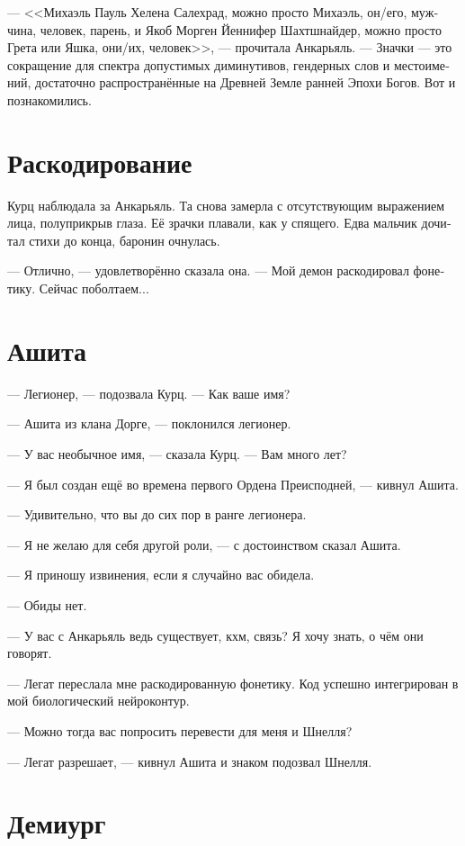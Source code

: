 \documentclass[a4paper,12pt,fleqn]{book}\usepackage{polyglossia}\setdefaultlanguage[babelshorthands=true]{russian}\setotherlanguage{english}\defaultfontfeatures{Ligatures=TeX,Mapping=tex-text}\usepackage{xcolor}\newcommand{\ml}[3]{#2}
\begin{document}
--- <<Михаэль Пауль Хелена Салехрад, можно просто Михаэль, он/его, мужчина, человек, парень, и Якоб Морген Йеннифер Шахтшнайдер, можно просто Грета или Яшка, они/их, человек>>, --- прочитала Анкарьяль.
--- Значки --- это сокращение для спектра допустимых диминутивов, гендерных слов и местоимений, достаточно распространённые на Древней Земле ранней Эпохи Богов.
Вот и познакомились.

\section{Раскодирование}

Курц наблюдала за Анкарьяль.
Та снова замерла с отсутствующим выражением лица, полуприкрыв глаза.
Её зрачки плавали, как у спящего.
Едва мальчик дочитал стихи до конца, баронин очнулась.

--- Отлично, --- удовлетворённо сказала она.
--- Мой демон раскодировал фонетику.
Сейчас поболтаем...

\section{Ашита}

--- Легионер, --- подозвала Курц.
--- Как ваше имя?

--- Ашита из клана Дорге, --- поклонился легионер.

--- У вас необычное имя, --- сказала Курц.
--- Вам много лет?

--- Я был создан ещё во времена первого Ордена Преисподней, --- кивнул Ашита.

--- Удивительно, что вы до сих пор в ранге легионера.

--- Я не желаю для себя другой роли, --- с достоинством сказал Ашита.

--- Я приношу извинения, если я случайно вас обидела.

--- Обиды нет.

--- У вас с Анкарьяль ведь существует, кхм, связь?
Я хочу знать, о чём они говорят.

--- Легат переслала мне раскодированную фонетику.
Код успешно интегрирован в мой биологический нейроконтур.

--- Можно тогда вас попросить перевести для меня и Шнелля?

--- Легат разрешает, --- кивнул Ашита и знаком подозвал Шнелля.

\section{Демиург}
\end{document}
